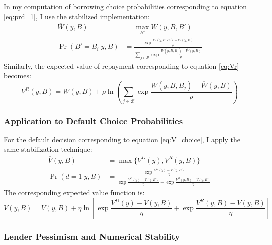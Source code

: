 \documentclass[12pt]{article}
\theoremstyle{plain}
\begin{document}
In my computation of borrowing choice probabilities corresponding to equation
\eqref{eq:prd_1}, I use the stabilized implementation:
\begin{align}
	\overline{W}(y,B) & = \max_{B'} W(y,B,B')                                                                                                          \\
	\Pr(B'=B_i|y,B)   & = \frac{\exp\frac{W(y,B,B_i)-\overline{W}(y,B)}{\rho}}{\sum_{j \in \mathcal{B}} \exp\frac{W(y,B,B_j)-\overline{W}(y,B)}{\rho}}
\end{align}
Similarly, the expected value of repayment corresponding to equation
\eqref{eq:Vr} becomes:
\begin{equation}
	V^R(y,B) = \overline{W}(y,B) + \rho \ln\left(\sum_{j \in \mathcal{B}} \exp\frac{W(y,B,B_j)-\overline{W}(y,B)}{\rho}\right)
\end{equation}

\subsubsection{Application to Default Choice Probabilities}

For the default decision corresponding to equation \eqref{eq:V_choice}, I apply
the same stabilization technique:
\begin{align}
	\overline{V}(y,B) & = \max\{V^D(y), V^R(y,B)\}                                                                                                                  \\
	\Pr(d=1|y,B)      & = \frac{\exp\frac{V^D(y)-\overline{V}(y,B)}{\eta}}{\exp\frac{V^D(y)-\overline{V}(y,B)}{\eta} + \exp\frac{V^R(y,B)-\overline{V}(y,B)}{\eta}}
\end{align}
The corresponding expected value function is:
\begin{equation}
	V(y,B) = \overline{V}(y,B) + \eta \ln\left[\exp\frac{V^D(y)-\overline{V}(y,B)}{\eta} + \exp\frac{V^R(y,B)-\overline{V}(y,B)}{\eta}\right]
\end{equation}

\subsubsection{Lender Pessimism and Numerical Stability}
\end{document}
